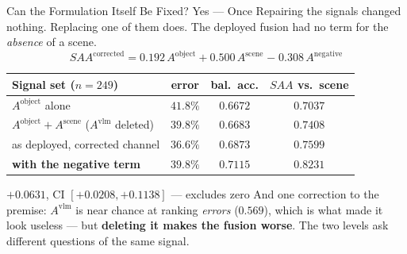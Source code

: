 \documentclass[aspectratio=169,11pt]{beamer}
\begin{document}
\begin{frame}{Can the Formulation Itself Be Fixed? Yes --- Once}
\small
Repairing the signals changed nothing. Replacing one of them does. The deployed fusion had no term for the \emph{absence} of a scene.
\vspace{1mm}
\begin{equation*}
SAA^{\text{corrected}} = 0.192\,A^{\text{object}} + 0.500\,A^{\text{scene}} \;\mathbf{-}\; 0.308\,A^{\text{negative}}
\end{equation*}
\vspace{-2mm}
\begin{center}
\scriptsize
\begin{tabular}{@{}l c c c@{}}
\toprule
\textbf{Signal set} ($n=249$) & \textbf{error} & \textbf{bal.\ acc.} & \textbf{$SAA$ vs.\ scene} \\
\midrule
$A^{\text{object}}$ alone & $41.8\%$ & $0.6672$ & $0.7037$ \\
$A^{\text{object}} + A^{\text{scene}}$ ($A^{\text{vlm}}$ deleted) & $39.8\%$ & $0.6683$ & $0.7408$ \\
as deployed, corrected channel & $\mathbf{36.6\%}$ & $0.6873$ & $0.7599$ \\
\textbf{with the negative term} & $39.8\%$ & $\mathbf{0.7115}$ & $\mathbf{0.8231}$ \\
\bottomrule
\end{tabular}
\end{center}
\vspace{1mm}
\begin{exampleblock}{\small $+0.0631$, CI $[+0.0208,+0.1138]$ --- excludes zero}
\footnotesize And one correction to the premise: $A^{\text{vlm}}$ is near chance at ranking \emph{errors} ($0.569$), which is what made it look useless --- but \textbf{deleting it makes the fusion worse}. The two levels ask different questions of the same signal.
\end{exampleblock}
\end{frame}
\end{document}
